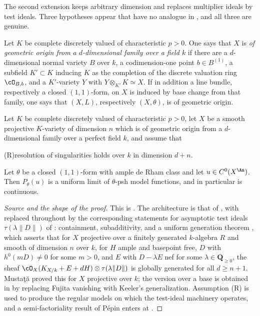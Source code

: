 The second extension keeps arbitrary dimension and replaces multiplier
ideals by test ideals.  Three hypotheses appear that have no analogue in
, and all three are genuine.

\begin{definition}
\label{def:ch23-geometric-origin}
Let \(K\) be complete discretely valued of characteristic \(p>0\).  One says
that \(X\) is \emph{of geometric origin from a \(d\)-dimensional family over
a field \(k\)} if there are a \(d\)-dimensional normal variety \(B\) over
\(k\), a codimension-one point \(b\in B^{(1)}\), a subfield
\(K'\subset K\) inducing \(K\) as the completion of the discrete valuation
ring \(\cO_{B,b}\), and a \(K'\)-variety \(Y\) with
\(Y\otimes_{K'}K\simeq X\).  If in addition a line bundle, respectively a
closed \((1,1)\)-form, on \(X\) is induced by base change from that family,
one says that \((X,L)\), respectively \((X,\theta)\), is of geometric
origin.
\end{definition}

\begin{theorem}
\label{thm:ch23-gjkm-positive-characteristic}
Let \(K\) be complete discretely valued of characteristic \(p>0\), let \(X\)
be a smooth projective \(K\)-variety of dimension \(n\) which is of
geometric origin from a \(d\)-dimensional family over a perfect field
\(k\), and assume that
\begin{center}
\textup{(R)}\quad resolution of singularities holds over \(k\)
in dimension \(d+n\).
\end{center}
Let \(\theta\) be a closed \((1,1)\)-form with ample de Rham class and let
\(u\in C^0(X^{\An})\).  Then \(P_\theta(u)\) is a uniform limit of
\(\theta\)-psh model functions, and in particular is continuous.
\end{theorem}

\begin{proof}[Source and the shape of the proof]
This is \cite[Theorem~8.2]{GJKM19}.  The architecture is that of
, with
 replaced throughout by the
corresponding statements for asymptotic test ideals
\(\tau(\lambda\|D\|)\) of : containment,
subadditivity, and a uniform generation theorem
\cite[Theorem~1.3 and Theorem~4.6]{GJKM19}, which asserts that for
\(X\) projective over a finitely generated \(k\)-algebra \(R\) and smooth of
dimension \(n\) over \(k\), for \(H\) ample and basepoint free, \(D\) with
\(h^0(mD)\neq0\) for some \(m>0\), and \(E\) with \(D-\lambda E\) nef for
some \(\lambda\in\mathbf Q_{\geq0}\), the sheaf
\(\cO_X(K_{X/k}+E+dH)\otimes\tau(\lambda\|D\|)\) is globally generated for
all \(d\geq n+1\).  Mustaţă proved this for \(X\) projective over \(k\);
the version over a base is obtained in \cite[Theorem~4.6]{GJKM19} by
replacing Fujita vanishing with Keeler's generalization.  Assumption
\textup{(R)} is used to produce the regular models on which the test-ideal
machinery operates, and a semi-factoriality result of P\'epin enters at
\cite[Lemma~7.5]{GJKM19}.
\end{proof}

